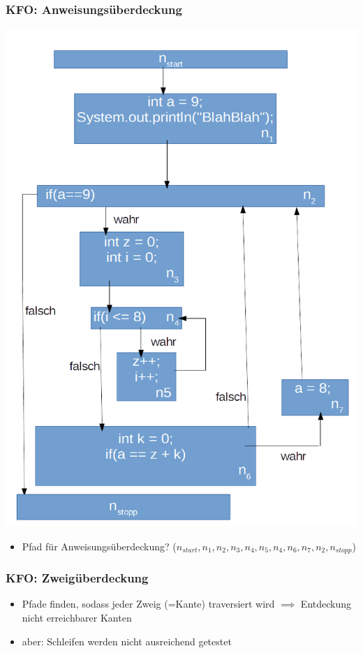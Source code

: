 \documentclass[18pt]{beamer}
\begin{document}
	\begin{frame}
		\frametitle{KFO: Anweisungsüberdeckung}
		\centering \includegraphics[scale=0.2]{./pics/tut5/test-without-goto.png}
		\begin{itemize}
			\item Pfad für Anweisungsüberdeckung? \pause ($n_{start}, n_1, n_2, n_3, n_4, n_5, n_4, n_6, n_7, n_2, n_{stopp}$) 
		\end{itemize}
	\end{frame}

	\begin{frame}
		\frametitle{KFO: Zweigüberdeckung}
		\begin{itemize}
			\item Pfade finden, sodass jeder Zweig (=Kante) traversiert wird \pause
			\linebreak $\implies$ Entdeckung nicht erreichbarer Kanten \pause
			\item aber: Schleifen werden nicht ausreichend getestet
		\end{itemize}
	\end{frame}
\end{document}
